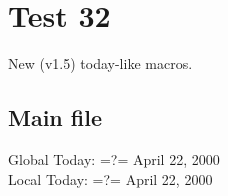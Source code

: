 \documentclass[12pt]{report}
\begin{document}
\chapter{Test 32}
New (v1.5) today-like macros.

\section{Main file}
\noindent
Global Today: \svntoday =?= April 22, 2000\\
Local Today: \svnfiletoday =?= April 22, 2000\\



\end{document}
